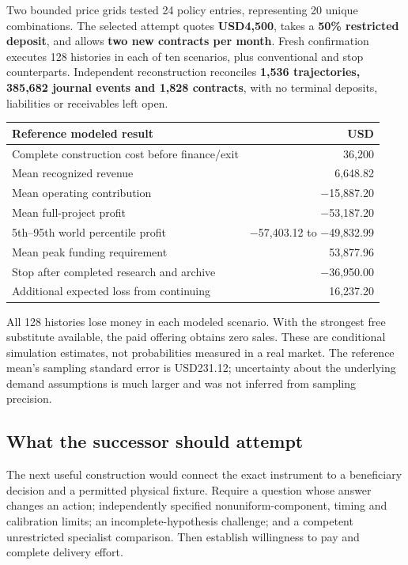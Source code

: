 \documentclass[
  10pt,
]{article}
\begin{document}
Two bounded price grids tested 24 policy entries, representing 20 unique
combinations. The selected attempt quotes \textbf{USD4,500}, takes a
\textbf{50\% restricted deposit}, and allows \textbf{two new contracts
per month}. Fresh confirmation executes 128 histories in each of ten
scenarios, plus conventional and stop counterparts. Independent
reconstruction reconciles \textbf{1,536 trajectories, 385,682 journal
events and 1,828 contracts}, with no terminal deposits, liabilities or
receivables left open.

\begin{longtable}[]{@{}lr@{}}
\toprule\noalign{}
Reference modeled result & USD \\
\midrule\noalign{}
\endhead
\bottomrule\noalign{}
\endlastfoot
Complete construction cost before finance/exit & 36,200 \\
Mean recognized revenue & 6,648.82 \\
Mean operating contribution & −15,887.20 \\
Mean full-project profit & −53,187.20 \\
5th--95th world percentile profit & −57,403.12 to −49,832.99 \\
Mean peak funding requirement & 53,877.96 \\
Stop after completed research and archive & −36,950.00 \\
Additional expected loss from continuing & 16,237.20 \\
\end{longtable}

All 128 histories lose money in each modeled scenario. With the
strongest free substitute available, the paid offering obtains zero
sales. These are conditional simulation estimates, not probabilities
measured in a real market. The reference mean's sampling standard error
is USD231.12; uncertainty about the underlying demand assumptions is
much larger and was not inferred from sampling precision.

\hypertarget{what-the-successor-should-attempt}{%
\subsection{What the successor should
attempt}\label{what-the-successor-should-attempt}}

The next useful construction would connect the exact instrument to a
beneficiary decision and a permitted physical fixture. Require a
question whose answer changes an action; independently specified
nonuniform-component, timing and calibration limits; an
incomplete-hypothesis challenge; and a competent unrestricted specialist
comparison. Then establish willingness to pay and complete delivery
effort.
\end{document}
